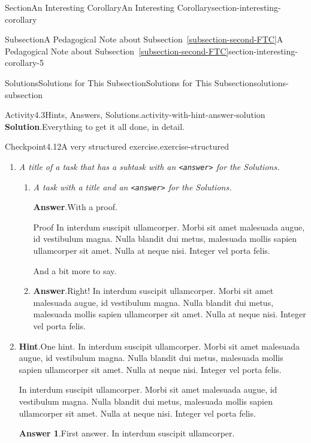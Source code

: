 \documentclass[twoside,10pt,]{article}
\newcommand{\blocktitlefont}{\relax}
\newcommand{\xreffont}{\relax}
\newcommand{\mono}[1]{\texttt{#1}}
\newcommand{\lititle}[1]{{\slshape#1}}
\numberwithin{equation}{section}
\begin{document}
\begin{sectionptx}{Section}{An Interesting Corollary}{}{An Interesting Corollary}{}{}{section-interesting-corollary}
\begin{subsectionptx}{Subsection}{A Pedagogical Note about Subsection~{\xreffont\ref*{subsection-second-FTC}}}{}{A Pedagogical Note about Subsection~{\xreffont\ref*{subsection-second-FTC}}}{}{}{section-interesting-corollary-5}
\begin{solutions-subsubsection}{Solutions}{Solutions for This Subsection}{}{Solutions for This Subsection}{}{}{solutions-subsection}
\begin{activitysolution}{Activity}{4.3}{Hints, Answers, Solutions.}{activity-with-hint-answer-solution}
\noindent\textbf{\blocktitlefont Solution}.\hypertarget{activity-with-hint-answer-solution-6-main}{}\quad{}Everything to get it all done, in detail.%
\end{activitysolution}%
\begin{inlinesolution}{Checkpoint}{4.12}{A very structured exercise.}{exercise-structured}%
\begin{enumerate}[font=\bfseries,label=(\alph*),ref=\alph*]%
\item[(c)]\lititle{A title of a task that has a subtask with an \mono{<answer>} for the Solutions.}\par%
\begin{enumerate}[font=\bfseries,label=(\roman*),ref=\theenumi.\roman*]%
\item[(i)]\lititle{A task with a title and an \mono{<answer>} for the Solutions.}\par%
\par\smallskip%
\noindent\textbf{\blocktitlefont Answer}.\hypertarget{exercise-structured-5-3-3-main}{}\quad{}With a proof.%
\begin{solutionproof}{Proof}
In interdum suscipit ullamcorper. Morbi sit amet malesuada augue, id vestibulum magna. Nulla blandit dui metus, malesuada mollis sapien ullamcorper sit amet. Nulla at neque nisi. Integer vel porta felis.%
\end{solutionproof}
And a bit more to say.%
\item[(ii)]\noindent\textbf{\blocktitlefont Answer}.\hypertarget{exercise-structured-5-4-2-main}{}\quad{}Right!  In interdum suscipit ullamcorper. Morbi sit amet malesuada augue, id vestibulum magna. Nulla blandit dui metus, malesuada mollis sapien ullamcorper sit amet. Nulla at neque nisi. Integer vel porta felis.%
\end{enumerate}%
\item[(d)]\noindent\textbf{\blocktitlefont Hint}.\hypertarget{exercise-structured-6-2-main}{}\quad{}One hint.  In interdum suscipit ullamcorper. Morbi sit amet malesuada augue, id vestibulum magna. Nulla blandit dui metus, malesuada mollis sapien ullamcorper sit amet. Nulla at neque nisi. Integer vel porta felis.%
\par
In interdum suscipit ullamcorper. Morbi sit amet malesuada augue, id vestibulum magna. Nulla blandit dui metus, malesuada mollis sapien ullamcorper sit amet. Nulla at neque nisi. Integer vel porta felis.%
\par\smallskip%
\noindent\textbf{\blocktitlefont Answer 1}.\hypertarget{exercise-structured-6-3-main}{}\quad{}First answer.  In interdum suscipit ullamcorper.%

\end{enumerate}
\end{inlinesolution}
\end{solutions-subsubsection}
\end{subsectionptx}
\end{sectionptx}
\end{document}
